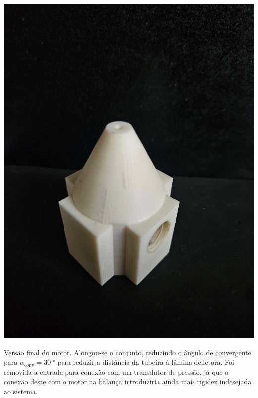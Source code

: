 \begin{minipage}{.49\textwidth}
    \includegraphics[width=\textwidth]{img/app_dev_history/motor6.jpeg}
\end{minipage}
\begin{minipage}{.49\textwidth}
    Versão final do motor. Alongou-se o conjunto, reduzindo o ângulo de convergente para \(\alpha_{\mathrm{conv}} = 30\;\mathrm{^\circ}\) para reduzir a distância da tubeira à lâmina defletora. Foi removida a entrada para conexão com um transdutor de pressão, já que a conexão deste com o motor na balança introduziria ainda mais rigidez indesejada ao sistema.
\end{minipage}